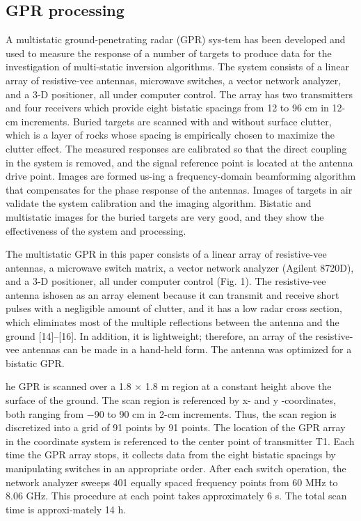 \documentclass[conference]{IEEEtran}
\begin{document}
\subsection{GPR processing}

A multistatic ground-penetrating radar (GPR) sys-tem has been developed and used to measure the response of a
number of targets to produce data for the investigation of multi-static inversion algorithms. The system consists of a linear array
of resistive-vee antennas, microwave switches, a vector network
analyzer, and a 3-D positioner, all under computer control. The
array has two transmitters and four receivers which provide eight
bistatic spacings from 12 to 96 cm in 12-cm increments. Buried
targets are scanned with and without surface clutter, which is a
layer of rocks whose spacing is empirically chosen to maximize the
clutter effect. The measured responses are calibrated so that the
direct coupling in the system is removed, and the signal reference
point is located at the antenna drive point. Images are formed us-ing a frequency-domain beamforming algorithm that compensates
for the phase response of the antennas. Images of targets in air
validate the system calibration and the imaging algorithm. Bistatic
and multistatic images for the buried targets are very good, and
they show the effectiveness of the system and processing.

The multistatic GPR in this paper consists of a linear array
of resistive-vee antennas, a microwave switch matrix, a vector
network analyzer (Agilent 8720D), and a 3-D positioner, all
under computer control (Fig. 1). The resistive-vee antenna ishosen as an array element because it can transmit and receive
short pulses with a negligible amount of clutter, and it has a
low radar cross section, which eliminates most of the multiple
reflections between the antenna and the ground [14]–[16]. In
addition, it is lightweight; therefore, an array of the resistive-vee antennas can be made in a hand-held form. The antenna
was optimized for a bistatic GPR.





he GPR is scanned over a 1.8 × 1.8 m region at a constant
height above the surface of the ground. The scan region is
referenced by x- and y -coordinates, both ranging from −90 to
90 cm in 2-cm increments. Thus, the scan region is discretized into a grid of 91 points by 91 points. The location of the
GPR array in the coordinate system is referenced to the center
point of transmitter T1. Each time the GPR array stops, it
collects data from the eight bistatic spacings by manipulating
switches in an appropriate order. After each switch operation,
the network analyzer sweeps 401 equally spaced frequency
points from 60 MHz to 8.06 GHz. This procedure at each
point takes approximately 6 s. The total scan time is approxi-mately 14 h.
\end{document}
